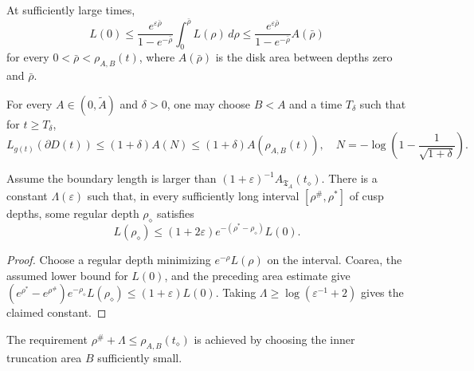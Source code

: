 \begin{corollary}
\label{cor:chow-iv-cusp-length-by-swept-area}
At sufficiently large times,
\[
 L(0)\le
 \frac{e^{\varepsilon\bar\rho}}{1-e^{-\bar\rho}}
 \int_0^{\bar\rho}L(\rho)\,d\rho
 \le\frac{e^{\varepsilon\bar\rho}}{1-e^{-\bar\rho}}A(\bar\rho)
\]
for every \(0<\bar\rho<\rho_{A,B}(t)\), where \(A(\bar\rho)\) is the disk area
between depths zero and \(\bar\rho\).
\end{corollary}

\begin{corollary}
\label{cor:chow-iv-area-almost-bounds-length}
For every \(A\in(0,\widetilde A)\) and \(\delta>0\), one may choose \(B<A\)
and a time \(T_\delta\) such that for \(t\ge T_\delta\),
\[
 L_{g(t)}(\partial D(t))\le(1+\delta)A(N)
 \le(1+\delta)A(\rho_{A,B}(t)),
 \quad N=-\log\left(1-\frac1{\sqrt{1+\delta}}\right).
\]
\end{corollary}

\begin{lemma}
\label{lem:chow-iv-short-loop-deep-cusp}
Assume the boundary length is larger than
\((1+\varepsilon)^{-1}A_{\mathfrak T_A}(t_\diamond)\).  There is a constant
\(\Lambda(\varepsilon)\) such that, in every sufficiently long interval
\([\rho^\#,\rho^*]\) of cusp depths, some regular depth \(\rho_\diamond\) satisfies
\[
 L(\rho_\diamond)\le(1+2\varepsilon)
 e^{-(\rho^*-\rho_\diamond)}L(0).
\]
\end{lemma}

\begin{proof}
Choose a regular depth minimizing \(e^{-\rho}L(\rho)\) on the interval.  Coarea,
the assumed lower bound for \(L(0)\), and the preceding area estimate give
\((e^{\rho^*}-e^{\rho^\#})e^{-\rho_\diamond}L(\rho_\diamond)
\le(1+\varepsilon)L(0)\).  Taking
\(\Lambda\ge\log(\varepsilon^{-1}+2)\) gives the claimed constant.
\end{proof}

\begin{remark}
\label{rem:chow-iv-short-loop-depth-requirement}
The requirement \(\rho^\#+\Lambda\le\rho_{A,B}(t_\diamond)\) is achieved by
choosing the inner truncation area \(B\) sufficiently small.
\end{remark}

